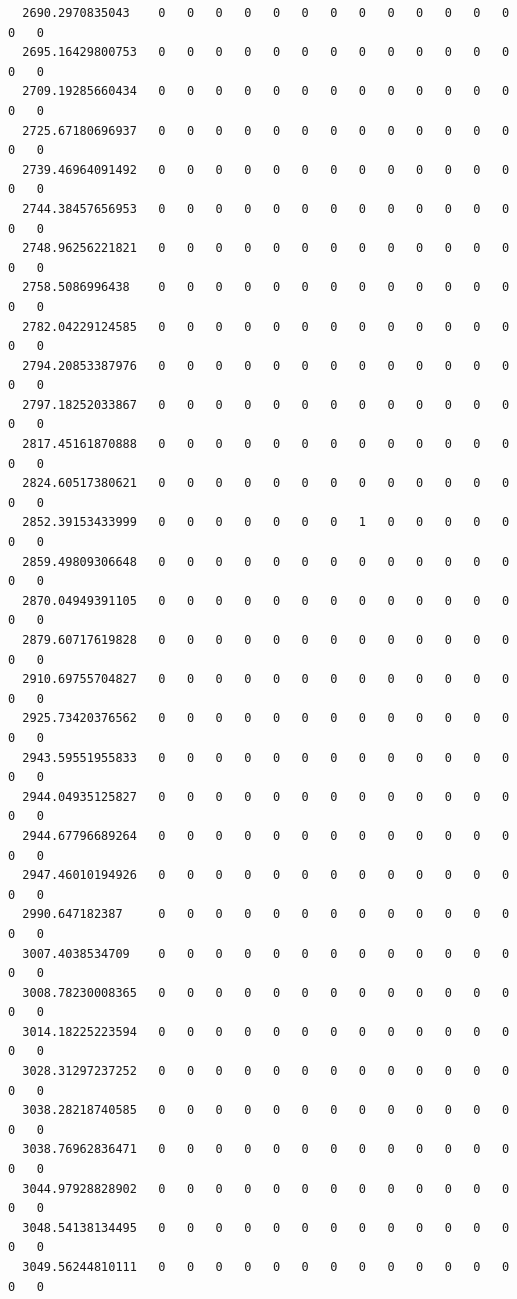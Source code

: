 \documentclass[
  letterpaper,
  DIV=11,
  numbers=noendperiod]{scrartcl}
\begin{document}
\begin{verbatim}
  2690.2970835043    0   0   0   0   0   0   0   0   0   0   0   0   0   0   0
  2695.16429800753   0   0   0   0   0   0   0   0   0   0   0   0   0   0   0
  2709.19285660434   0   0   0   0   0   0   0   0   0   0   0   0   0   0   0
  2725.67180696937   0   0   0   0   0   0   0   0   0   0   0   0   0   0   0
  2739.46964091492   0   0   0   0   0   0   0   0   0   0   0   0   0   0   0
  2744.38457656953   0   0   0   0   0   0   0   0   0   0   0   0   0   0   0
  2748.96256221821   0   0   0   0   0   0   0   0   0   0   0   0   0   0   0
  2758.5086996438    0   0   0   0   0   0   0   0   0   0   0   0   0   0   0
  2782.04229124585   0   0   0   0   0   0   0   0   0   0   0   0   0   0   0
  2794.20853387976   0   0   0   0   0   0   0   0   0   0   0   0   0   0   0
  2797.18252033867   0   0   0   0   0   0   0   0   0   0   0   0   0   0   0
  2817.45161870888   0   0   0   0   0   0   0   0   0   0   0   0   0   0   0
  2824.60517380621   0   0   0   0   0   0   0   0   0   0   0   0   0   0   0
  2852.39153433999   0   0   0   0   0   0   0   1   0   0   0   0   0   0   0
  2859.49809306648   0   0   0   0   0   0   0   0   0   0   0   0   0   0   0
  2870.04949391105   0   0   0   0   0   0   0   0   0   0   0   0   0   0   0
  2879.60717619828   0   0   0   0   0   0   0   0   0   0   0   0   0   0   0
  2910.69755704827   0   0   0   0   0   0   0   0   0   0   0   0   0   0   0
  2925.73420376562   0   0   0   0   0   0   0   0   0   0   0   0   0   0   0
  2943.59551955833   0   0   0   0   0   0   0   0   0   0   0   0   0   0   0
  2944.04935125827   0   0   0   0   0   0   0   0   0   0   0   0   0   0   0
  2944.67796689264   0   0   0   0   0   0   0   0   0   0   0   0   0   0   0
  2947.46010194926   0   0   0   0   0   0   0   0   0   0   0   0   0   0   0
  2990.647182387     0   0   0   0   0   0   0   0   0   0   0   0   0   0   0
  3007.4038534709    0   0   0   0   0   0   0   0   0   0   0   0   0   0   0
  3008.78230008365   0   0   0   0   0   0   0   0   0   0   0   0   0   0   0
  3014.18225223594   0   0   0   0   0   0   0   0   0   0   0   0   0   0   0
  3028.31297237252   0   0   0   0   0   0   0   0   0   0   0   0   0   0   0
  3038.28218740585   0   0   0   0   0   0   0   0   0   0   0   0   0   0   0
  3038.76962836471   0   0   0   0   0   0   0   0   0   0   0   0   0   0   0
  3044.97928828902   0   0   0   0   0   0   0   0   0   0   0   0   0   0   0
  3048.54138134495   0   0   0   0   0   0   0   0   0   0   0   0   0   0   0
  3049.56244810111   0   0   0   0   0   0   0   0   0   0   0   0   0   0   0

\end{verbatim}
\end{document}
